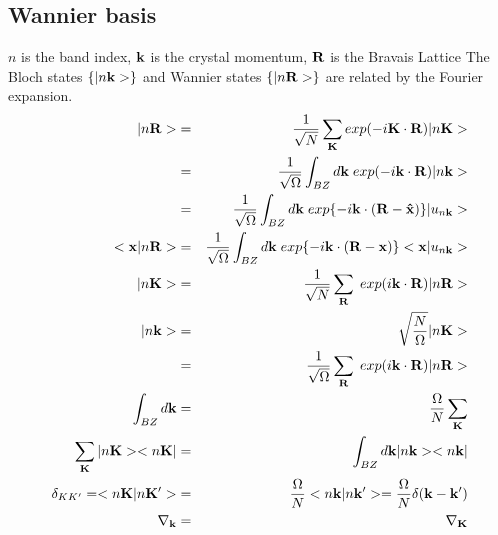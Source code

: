 \documentclass[aps,prb,preprint]{revtex4-1}
\begin{document}
\begin{appendix}
\section{Wannier basis}
$n$ is the band index, $\bf k$ is the crystal momentum, ${\bf R} $ is the Bravais Lattice
The Bloch states $\{ |n{\bf k}> \}$ and Wannier states $\{ |n{\bf R}> \}$ are related by the Fourier expansion. 
\begin{eqnarray}
|n{\bf R}> &=&\frac{1}{\sqrt{N}} \sum_{\bf K} exp(-i{\bf K} \cdot {\bf R})|n{\bf K}> \nonumber\\
&=&\frac{1}{\sqrt{\Omega}} \int_{BZ} d{\bf k} \; exp(-i{\bf k} \cdot {\bf R})|n{\bf k}> \nonumber\\
&=&\frac{1}{\sqrt{\Omega}} \int_{BZ} d{\bf k} \; exp\{-i{\bf k} \cdot ({\bf R- \hat{x}})\}|u_{n{\bf k}}>\\
<{\bf x}|n{\bf R}>&=& \frac{1}{\sqrt{\Omega}} \int_{BZ} d{\bf k} \; exp\{-i{\bf k} \cdot ({\bf R- x})\}<{\bf x}|u_{n{\bf k}}> \\
|n{\bf K}>&=& \frac{1}{\sqrt{N}} \sum_{\bf R} \; exp(i{\bf k} \cdot {\bf R}) |n{\bf R}> \\
|n{\bf k}>&=&  \sqrt{\frac{N}{\Omega}} |n{\bf K}> \nonumber \\
&=& \frac{1}{\sqrt{\Omega}} \sum_{\bf R} \; exp(i{\bf k} \cdot {\bf R}) |n{\bf R}> \\
 \int_{BZ} d{\bf k} &=& \frac{\Omega}{N} \sum_{\bf K}\\
\sum_{\bf K} |n{\bf K}><n{\bf K}| &=& \int_{BZ} d{\bf k} |n{\bf k}><n{\bf k}|\\
 \delta_{KK'} =<n{\bf K}|n{\bf K'}> &=& \frac{\Omega}{N} <n{\bf k}|n{\bf k'}> = \frac{\Omega}{N} \delta({\bf k-k'})\\
 \nabla_{\bf k} &=& \nabla_{\bf K}
 \end{eqnarray} 


\end{appendix}
\end{document}
